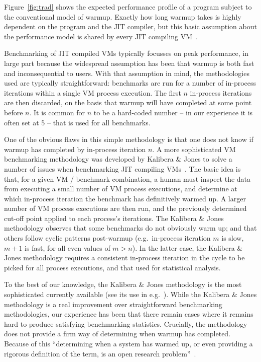 \documentclass[a4paper,UKenglish]{lipics}
\newcommand{\kalibera}{Kalibera \& Jones\xspace}
\begin{document}
Figure~\ref{fig:trad} shows the expected performance profile of a
program subject to the conventional model of warmup. Exactly how long warmup
takes is highly dependent on
the program and the JIT compiler, but this basic assumption about the
performance model is shared by every JIT compiling
VM~\cite{kalibera13rigorous}.

Benchmarking of JIT compiled VMs typically focusses on peak
performance, in large part because the widespread assumption has been that
warmup is both fast and inconsequential to users. With that assumption in mind, the
methodologies used are typically straightforward: benchmarks are run for a number
of in-process iterations within a single VM process execution.
The first $n$ in-process iterations are then discarded, on the basis that warmup
will have completed at some point before $n$. It is common for
$n$ to be a hard-coded number -- in our experience it is often set at 5 --
that is used for all benchmarks.

One of the obvious flaws in this simple methodology is that one does not know if warmup
has completed by in-process iteration $n$. A more sophisticated VM benchmarking methodology
was developed by \kalibera to solve a number of issues when benchmarking JIT
compiling VMs~\cite{kalibera12quantifying,kalibera13rigorous}. The basic idea is
that, for a given VM / benchmark combination, a human must inspect the data from
executing a small number of VM process executions, and determine at which in-process iteration the
benchmark has definitively warmed up. A larger number of VM process executions are then
run, and the previously determined cut-off point applied to each process's
iterations. The \kalibera methodology observes that some benchmarks do not
obviously warm up; and that others follow cyclic patterns post-warmup
(e.g.~in-process iteration $m$ is slow, $m+1$ is fast, for all even values of $m > n$). In
the latter case, the \kalibera methodology requires a consistent in-process iteration in
the cycle to be picked for all process executions, and that used for statistical analysis.

To the best of our knowledge, the \kalibera methodology is the most
sophisticated currently available (see its use in
e.g.~\cite{barrett15approaches,grimmer15dynamically}). While the \kalibera
methodology is a real improvement over straightforward benchmarking methodologies,
our experience has been that there remain cases where it remains hard to produce
satisfying benchmarking statistics. Crucially, the methodology does not
provide a firm way of determining when warmup has completed. Because of this
``determining when a system has warmed up, or even providing a
rigorous definition of the term, is an open research problem''~\cite{seaton15phd}.
\end{document}
